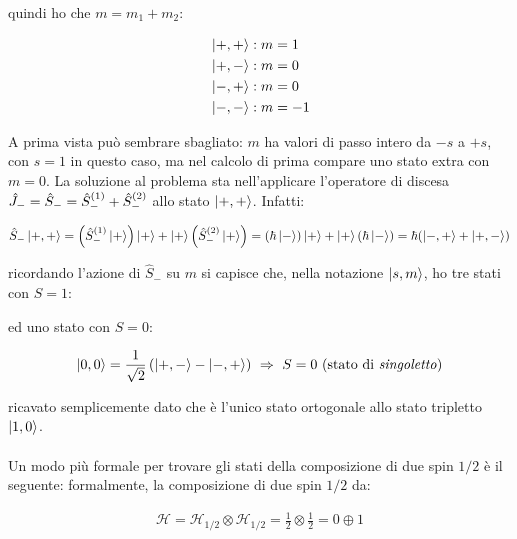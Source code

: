 	quindi ho che $m = m_1 + m_2$:

\begin{align*}
	& \ket{+, +} : m = 1 \\
	& \ket{+, -} : m = 0 \\
	& \ket{-, +} : m = 0 \\
	& \ket{-, -} : m = -1
\end{align*}

	A prima vista può sembrare sbagliato: $m$ ha valori di passo intero da $-s$ a $+s$, con $s = 1$ in questo caso, ma nel calcolo di prima compare uno stato extra con $m = 0$. La soluzione al problema sta nell'applicare l'operatore di discesa $\hat{J}_- = \hat{S}_- = \hat{S}_-^{\qty(1)} + \hat{S}_-^{\qty(2)}$ allo stato $\ket{+, +}$. Infatti:
	
\begin{align*}
	\hat{S}_- \ket{+, +} = \qty(\hat{S}_{-}^{\qty(1)} \ket{+}) \ket{+} + \ket{+} \qty(\hat{S}_{-}^{\qty(2)} \ket{+}) = \qty(\hbar \ket{-}) \ket{+} + \ket{+ }\qty(\hbar \ket{-}) = \hbar \qty(\ket{-, +} + \ket{+, -})
\end{align*}

	ricordando l'azione di $\hat{S}_-$ su $m$ si capisce che, nella notazione $\ket{s, m}$, ho tre stati con $S = 1$:
	

	ed uno stato con $S = 0$:
	
\begin{align*}
	\ket{0, 0} = \frac{1}{\sqrt{2}}\, \qty(\ket{+, -} - \ket{-, +}) \, \, \Rightarrow \, \, S = 0 \, \, \text{(stato di \textit{singoletto})}
\end{align*}

	ricavato semplicemente dato che è l'unico stato ortogonale allo stato tripletto $\ket{1, 0}$.
	\\
	\\
	Un modo più formale per trovare gli stati della composizione di due spin $1/2$ è il seguente: formalmente, la composizione di due spin $1/2$ da:
	
\begin{align*}
	\mathcal{H} = \mathcal{H}_{1/2} \otimes \mathcal{H}_{1/2} = \frac{1}{2} \otimes \frac{1}{2} = 0 \oplus 1
\end{align*}
 
